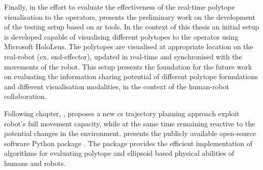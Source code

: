 Finally, in the effort to evaluate the effectiveness of the real-time polytope visualisation to the operators, 
 presents the preliminary work on the development of the testing setup based on \gls{ar} tools. In the context of this thesis an initial setup is developed capable of visualising different polytopes to the operator using Microsoft HoloLens. The polytopes are visualised at appropriate location on the real-robot (ex. end-effector), updated in real-time and synchronised with the movements of the robot. This setup presents the foundation for the future work on evaluating the information sharing potential of different polytope formulations and different visualisation modalities, in the context of the human-robot collaboration.


Following chapter, , proposes a new \gls{cs} trajectory planning approach exploit robot's full movement capacity, while at the same time remaining reactive to the potential changes in the environment. 
 presents the publicly available open-source software Python package . The package provides the efficient implementation of algorithms for evaluating polytope and ellipsoid based physical abilities of humans and robots.
